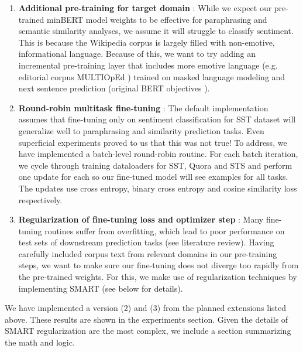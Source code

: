 \documentclass{article}
\begin{document}
\begin{enumerate}
    \item \textbf{Additional pre-training for target domain} \cite{pretrain}: While we expect our pre-trained minBERT model weights to be effective for paraphrasing and semantic similarity analyses, we assume it will struggle to classify sentiment. This is because the Wikipedia corpus is largely filled with non-emotive, informational language. Because of this, we want to try adding an incremental pre-training layer that includes more emotive language (e.g. editorial corpus MULTIOpEd \cite{multioped}) trained on masked language modeling and next sentence prediction (original BERT objectives \cite{bert}). 

    \item \textbf{Round-robin multitask fine-tuning} \cite{handout}: The default implementation assumes that fine-tuning only on sentiment classification for SST dataset will generalize well to paraphrasing and similarity prediction tasks. Even superficial experiments proved to us that this was not true! To address, we have implemented a batch-level round-robin routine. For each batch iteration, we cycle through training dataloaders for SST, Quora and STS and perform one update for each so our fine-tuned model will see examples for all tasks. The updates use cross entropy, binary cross entropy and cosine similarity loss respectively.

    \item \textbf{Regularization of fine-tuning loss and optimizer step} \cite{smart}: Many fine-tuning routines suffer from overfitting, which lead to poor performance on test sets of downstream prediction tasks (see literature review). Having carefully included corpus text from relevant domains in our pre-training steps, we want to make sure our fine-tuning does not diverge too rapidly from the pre-trained weights. For this, we make use of regularization techniques by implementing SMART (see below for details).
\end{enumerate}

We have implemented a version (2) and (3) from the planned extensions listed above. These results are shown in the experiments section. Given the details of SMART regularization are the most complex, we include a section summarizing the math and logic.

\end{document}

